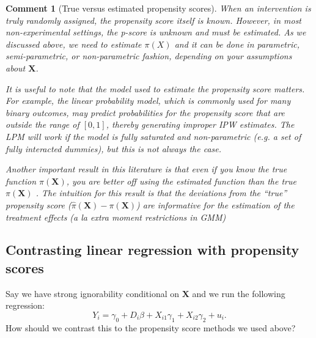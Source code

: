 \documentclass{tufte-handout}
\theoremstyle{break}
\newtheorem{cmt}{Comment}
\newcommand{\bX}{\mathbf{X}}
\begin{document}
\begin{boxF}
\begin{cmt}[True versus estimated propensity scores]
 When an intervention is truly randomly assigned, the propensity score itself is known. However, in most non-experimental settings, the p-score is unknown and must be estimated. As we discussed above, we need to estimate $\pi(X)$ and it can be done in parametric, semi-parametric, or non-parametric fashion, depending on your assumptions about $\bX$. 

 \hspace{10pt}It is useful to note that the model used to estimate the propensity score matters. For example, the linear probability model, which is commonly used for many binary outcomes, may predict probabilities for the propensity score that are outside the range of $[0,1]$, thereby generating improper IPW estimates. The LPM will work if the model is fully saturated and non-parametric (e.g. a set of fully interacted dummies), but this is not always the case. 


 \hspace{10pt}Another important result in this literature is that \emph{even if you know the true function $\pi(\mathbf{X})$}, you are better off using the estimated function than the true $\pi(\bX)$ \citep{hirano2003efficient}. The intuition for this result is that the deviations from the ``true'' propensity score ($\hat{\pi}(\mathbf{X}) - \pi(\mathbf{X})$) are informative for the estimation of the treatment effects (a la extra moment restrictions in GMM)

\end{cmt}
\end{boxF}

\subsection{Contrasting linear regression with propensity scores}


Say we have strong ignorability conditional on $\bX$ and we run the following regression:
    \begin{equation}
      \label{eq:regression_imputation}
      Y_{i} = \gamma_{0} + D_{i}\beta + X_{i1}\gamma_{1} + X_{i2}\gamma_{2} + u_{i}.
    \end{equation}
How should we contrast this to the propensity score methods we used above? 
\end{document}
